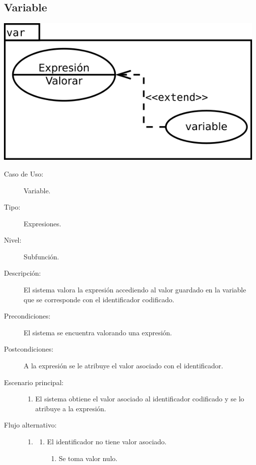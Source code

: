 \subsection {Variable}
\begin{center}
\includegraphics[scale=0.4]{id.png} \\
\end{center}
\begin{framed}
\FloatBarrier
\begin{description}
   \item[Caso de Uso:]  Variable.
   \item [Tipo:] Expresiones.
   \item[Nivel:]  Subfunción.
   \item[Descripción:] 
   El sistema valora la expresión accediendo al valor guardado en la variable que se corresponde con el identificador 
   codificado.
   \item[Precondiciones:] 
   El sistema se encuentra valorando una expresión.
   \item[Postcondiciones:] 
   A la expresión se le atribuye el valor asociado con el identificador. 
   \item[Escenario principal:] \hfill
   \begin{enumerate}
   \item El sistema obtiene el valor asociado al identificador codificado y se lo atribuye 
   a la expresión.
   \end{enumerate}
   \item[Flujo alternativo:] \hfill 
   \begin{enumerate} \itemsep1pt \parskip0pt 
   \setcounter{enumi}{0}
   \renewcommand{\labelenumi}{}
   \renewcommand{\labelenumiii}{\arabic{enumiii}.}
   \renewcommand{\labelenumii}{\arabic{enumi}\alph{enumii}.}
      \item 
      \begin {enumerate}
         \setcounter{enumii}{0}
         \item El identificador no tiene valor asociado.
         \begin{enumerate}
         \item Se toma valor nulo. 
         \end{enumerate}
      \end{enumerate}
   \end{enumerate}
\end{description}
 \FloatBarrier
\end{framed}

